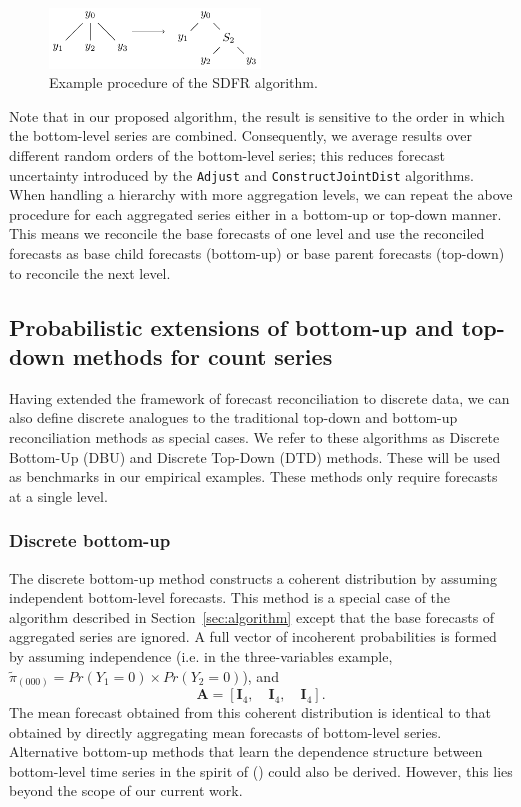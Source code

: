 \documentclass[a4paper,review,11pt,authoryear]{elsarticle}
\let\code=\texttt
\theoremstyle{definition}
\begin{document}
  \begin{figure}
    \centering
    \includegraphics[width=0.5\textwidth]{figures/sdfr.pdf}
    \caption{\label{fig:sdfr}Example procedure of the SDFR algorithm.}
  \end{figure}

  Note that in our proposed algorithm, the result is sensitive to the order in which the bottom-level series are combined. Consequently, we average results over different random orders of the bottom-level series; this reduces forecast uncertainty introduced by the \code{Adjust} and \code{ConstructJointDist} algorithms.
  When handling a hierarchy with more aggregation levels, we can repeat the above procedure for each aggregated series either in a bottom-up or top-down manner. This means we reconcile the base forecasts of one level and use the reconciled forecasts as base child forecasts (bottom-up) or base parent forecasts (top-down) to reconcile the next level.



    \subsection{Probabilistic extensions of bottom-up and top-down methods for count series}

    Having extended the framework of forecast reconciliation to discrete data, we can also define discrete analogues to the traditional top-down and bottom-up reconciliation methods as special cases. We refer to these algorithms as Discrete Bottom-Up (DBU) and Discrete Top-Down (DTD) methods. These will be used as benchmarks in our empirical examples. These methods only require forecasts at a single level.
    
    \subsubsection*{\textbf{Discrete bottom-up}}
    \label{sec:bottomup}

    The discrete bottom-up method constructs a coherent distribution by assuming independent bottom-level forecasts.
    This method is a special case of the algorithm described in Section~\ref{sec:algorithm} except that the base forecasts of aggregated series are ignored. A full vector of incoherent probabilities is formed by assuming independence (i.e. in the three-variables example, $\tilde{\pi}_{(000)} = Pr(Y_1=0)\times Pr(Y_2=0)$), and \[
    \mathbf{A} = [\mathbf{I}_4, \quad \mathbf{I}_4, \quad \mathbf{I}_4 ].
    \]
    The mean forecast obtained from this coherent distribution is identical to that obtained by directly aggregating mean forecasts of bottom-level series. Alternative bottom-up methods that learn the dependence structure between bottom-level time series in the spirit of (\citealp{bentaiebHierarchicalProbabilisticForecasting2020}) could also be derived. However, this lies beyond the scope of our current work.
    
\end{document}
